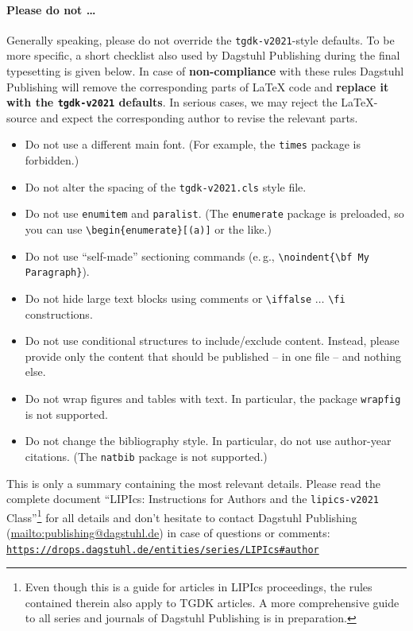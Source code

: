 \documentclass{article}
\begin{document}
\paragraph*{Please do not \ldots} %
Generally speaking, please do not override the \texttt{tgdk-v2021}-style defaults. To be more specific, a short checklist also used by Dagstuhl Publishing during the final typesetting is given below.
In case of \textbf{non-compliance} with these rules Dagstuhl Publishing will remove the corresponding parts of \LaTeX{} code and \textbf{replace it with the \texttt{tgdk-v2021} defaults}. In serious cases, we may reject the LaTeX-source and expect the corresponding author to revise the relevant parts.
\begin{itemize}
\item Do not use a different main font. (For example, the \texttt{times} package is forbidden.)
\item Do not alter the spacing of the \texttt{tgdk-v2021.cls} style file.
\item Do not use \verb+enumitem+ and \verb+paralist+. (The \texttt{enumerate} package is preloaded, so you can use
 \verb+\begin{enumerate}[(a)]+ or the like.)
\item Do not use ``self-made'' sectioning commands (e.\,g., \verb+\noindent{\bf My+ \verb+Paragraph}+).
\item Do not hide large text blocks using comments or \verb+\iffalse+ $\ldots$ \verb+\fi+ constructions. 
\item Do not use conditional structures to include/exclude content. Instead, please provide only the content that should be published -- in one file -- and nothing else.
\item Do not wrap figures and tables with text. In particular, the package \texttt{wrapfig} is not supported.
\item Do not change the bibliography style. In particular, do not use author-year citations. (The
\texttt{natbib} package is not supported.)
\end{itemize}

\enlargethispage{\baselineskip}

This is only a summary containing the most relevant details. Please read the complete document ``LIPIcs: Instructions for Authors and the \texttt{lipics-v2021} Class''\footnote{Even though this is a guide for articles in LIPIcs proceedings, the rules contained therein also apply to TGDK articles. A more comprehensive guide to all series and journals of Dagstuhl Publishing is in preparation.} for all details and don't hesitate to contact Dagstuhl Publishing (\url{mailto:publishing@dagstuhl.de}) in case of questions or comments:
\href{https://drops.dagstuhl.de/entities/series/LIPIcs#author}{\texttt{https://drops.dagstuhl.de/entities/series/LIPIcs\#author}}
\end{document}
